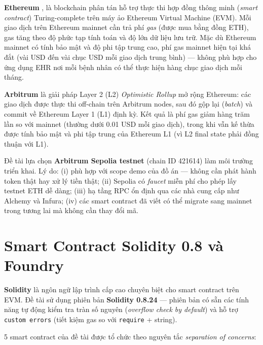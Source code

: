 \documentclass[../DoAn]{subfiles}
\begin{document}
\textbf{Ethereum} \cite{buterin2013ethereum}, \cite{wood2014ethereum} là blockchain phân tán hỗ trợ thực thi hợp đồng thông minh (\textit{smart contract}) Turing-complete trên máy ảo Ethereum Virtual Machine (EVM). Mỗi giao dịch trên Ethereum mainnet cần trả phí \textit{gas} (được mua bằng đồng ETH), gas tăng theo độ phức tạp tính toán và độ lớn dữ liệu lưu trữ. Mặc dù Ethereum mainnet có tính bảo mật và độ phi tập trung cao, phí gas mainnet hiện tại khá đắt (vài USD đến vài chục USD mỗi giao dịch trung bình) --- không phù hợp cho ứng dụng EHR nơi mỗi bệnh nhân có thể thực hiện hàng chục giao dịch mỗi tháng.

\textbf{Arbitrum} \cite{arbitrum2022nitro} là giải pháp Layer 2 (L2) \textit{Optimistic Rollup} mở rộng Ethereum: các giao dịch được thực thi off-chain trên Arbitrum nodes, sau đó gộp lại (\textit{batch}) và commit về Ethereum Layer 1 (L1) định kỳ. Kết quả là phí gas giảm hàng trăm lần so với mainnet (thường dưới 0.01 USD mỗi giao dịch), trong khi vẫn kế thừa được tính bảo mật và phi tập trung của Ethereum L1 (vì L2 final state phải đồng thuận với L1).

Đề tài lựa chọn \textbf{Arbitrum Sepolia testnet} (chain ID 421614) làm môi trường triển khai. Lý do: (i) phù hợp với scope demo của đồ án --- không cần phát hành token thật hay xử lý tiền thật; (ii) Sepolia có \textit{faucet} miễn phí cho phép lấy testnet ETH dễ dàng; (iii) hạ tầng RPC ổn định qua các nhà cung cấp như Alchemy và Infura; (iv) các smart contract đã viết có thể migrate sang mainnet trong tương lai mà không cần thay đổi mã.

\section{Smart Contract Solidity 0.8 và Foundry}

\textbf{Solidity} là ngôn ngữ lập trình cấp cao chuyên biệt cho smart contract trên EVM. Đề tài sử dụng phiên bản \textbf{Solidity 0.8.24} --- phiên bản có sẵn các tính năng tự động kiểm tra tràn số nguyên (\textit{overflow check by default}) và hỗ trợ \texttt{custom errors} (tiết kiệm gas so với \texttt{require} + string).

5 smart contract của đề tài được tổ chức theo nguyên tắc \textit{separation of concerns}:
\end{document}
